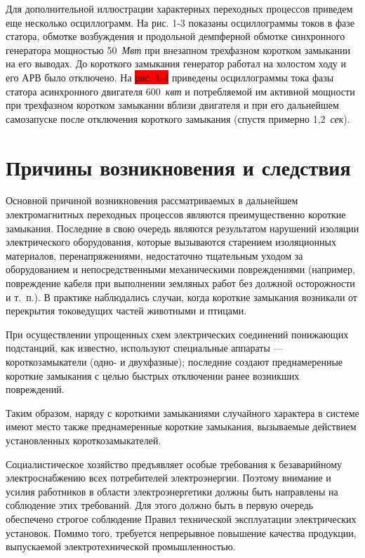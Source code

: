 
Для дополнительной иллюстрации характерных переходных процессов приведем еще несколько осциллограмм. На рис. 1-3 показаны осциллограммы токов в фазе статора, обмотке возбуждения и продольной демпферной обмотке синхронного генератора мощностью 50~\textit{Мвт} при внезапном трехфазном коротком замыкании на его выводах. До короткого замыкания генератор работал на холостом ходу и его АРВ было отключено. На \colorbox{red}{рис. 1-4} приведены осциллограммы тока фазы статора асинхронного двигателя 600~\textit{квт} и потребляемой им активной мощности при трехфазном коротком замыкании вблизи двигателя и при его дальнейшем самозапуске после отключения короткого замыкания (спустя примерно 1,2~\textit{сек}).

\section{Причины возникновения и следствия}
\label{sec:1-2 prichiny_vozniknoveniia_i_sledstviia}

Основной причиной возникновения рассматриваемых в дальнейшем электромагнитных переходных процессов являются преимущественно короткие замыкания. Последние в свою очередь являются результатом нарушений изоляции электрического оборудования, которые вызываются старением изоляционных материалов, перенапряжениями, недостаточно тщательным уходом за оборудованием и непосредственными механическими повреждениями (например, повреждение кабеля при выполнении земляных работ без должной осторожности и т.~п.). В практике наблюдались случаи, когда короткие замыкания возникали от перекрытия токоведущих частей животными и птицами.

При осуществлении упрощенных схем электрических соединений понижающих подстанций, как известно, используют специальные аппараты --- короткозамыкатели (одно- и двухфазные); последние создают преднамеренные короткие замыкания с целью быстрых отключении ранее возникших повреждений.

Таким образом, наряду с короткими замыканиями случайного характера в системе имеют место также преднамеренные короткие замыкания, вызываемые действием установленных короткозамыкателей.

Социалистическое хозяйство предъявляет особые требования к безаварийному электроснабжению всех потребителей электроэнергии. Поэтому внимание и усилия работников в области электроэнергетики должны быть направлены на соблюдение этих требований. Для этого должно быть в первую очередь обеспечено строгое соблюдение Правил технической эксплуатации электрических установок. Помимо того, требуется непрерывное повышение качества продукции, выпускаемой электротехнической промышленностью.

